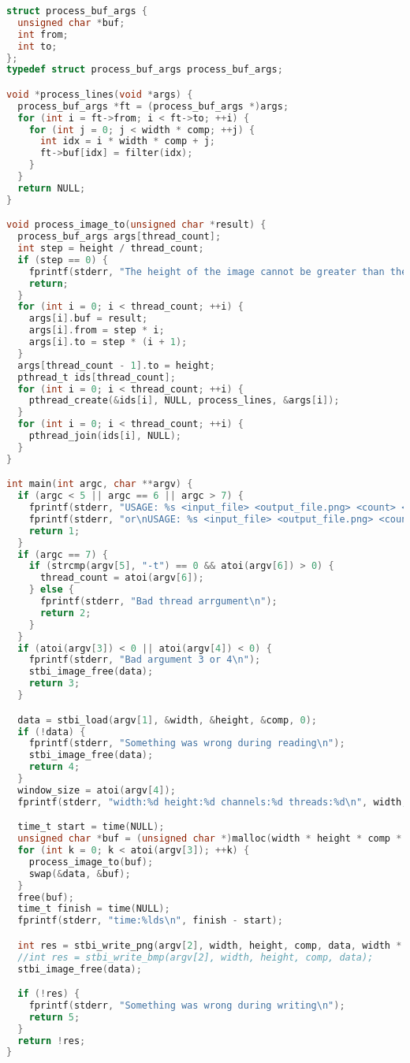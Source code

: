 \begin{lstlisting}[language=C]
struct process_buf_args {
  unsigned char *buf;
  int from;
  int to;
};
typedef struct process_buf_args process_buf_args;

void *process_lines(void *args) {
  process_buf_args *ft = (process_buf_args *)args;
  for (int i = ft->from; i < ft->to; ++i) {
    for (int j = 0; j < width * comp; ++j) {
      int idx = i * width * comp + j;
      ft->buf[idx] = filter(idx);
    }
  }
  return NULL;
}

void process_image_to(unsigned char *result) {
  process_buf_args args[thread_count];
  int step = height / thread_count;
  if (step == 0) {
    fprintf(stderr, "The height of the image cannot be greater than the number of threads\n");
    return;
  }
  for (int i = 0; i < thread_count; ++i) {
    args[i].buf = result;
    args[i].from = step * i;
    args[i].to = step * (i + 1);
  }
  args[thread_count - 1].to = height;
  pthread_t ids[thread_count];
  for (int i = 0; i < thread_count; ++i) {
    pthread_create(&ids[i], NULL, process_lines, &args[i]);
  }
  for (int i = 0; i < thread_count; ++i) {
    pthread_join(ids[i], NULL);
  }
}

int main(int argc, char **argv) {
  if (argc < 5 || argc == 6 || argc > 7) {
    fprintf(stderr, "USAGE: %s <input_file> <output_file.png> <count> <window_size>\n", argv[0]);
    fprintf(stderr, "or\nUSAGE: %s <input_file> <output_file.png> <count> <window_size> -t <thread_count>\n", argv[0]);
    return 1;
  }
  if (argc == 7) {
    if (strcmp(argv[5], "-t") == 0 && atoi(argv[6]) > 0) {
      thread_count = atoi(argv[6]);
    } else {
      fprintf(stderr, "Bad thread arrgument\n");
      return 2;
    }
  }
  if (atoi(argv[3]) < 0 || atoi(argv[4]) < 0) {
    fprintf(stderr, "Bad argument 3 or 4\n");
    stbi_image_free(data);
    return 3;
  }

  data = stbi_load(argv[1], &width, &height, &comp, 0);
  if (!data) {
    fprintf(stderr, "Something was wrong during reading\n");
    stbi_image_free(data);
    return 4;
  }
  window_size = atoi(argv[4]);
  fprintf(stderr, "width:%d height:%d channels:%d threads:%d\n", width, height, comp, thread_count);

  time_t start = time(NULL);
  unsigned char *buf = (unsigned char *)malloc(width * height * comp * sizeof(unsigned char));
  for (int k = 0; k < atoi(argv[3]); ++k) {
    process_image_to(buf);
    swap(&data, &buf);
  }
  free(buf);
  time_t finish = time(NULL);
  fprintf(stderr, "time:%lds\n", finish - start);

  int res = stbi_write_png(argv[2], width, height, comp, data, width * comp);
  //int res = stbi_write_bmp(argv[2], width, height, comp, data);
  stbi_image_free(data);

  if (!res) {
    fprintf(stderr, "Something was wrong during writing\n");
    return 5;
  }
  return !res;
}

\end{lstlisting}

\pagebreak